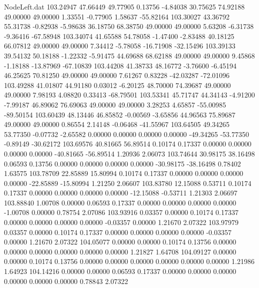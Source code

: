 \begin{filecontents}{NodeLeft.dat}
 103.24947   47.66449   49.77905     0.13756   -4.84038   30.75625   74.92188   49.00000   49.00000    1.33551   -0.77905    1.58637  -55.82164
 103.30027   43.36792   55.31738    -0.82938   -5.98638   36.18750   68.38750   49.00000   49.00000    5.63208   -6.31738   -9.36416  -67.58948
 103.34074   41.65588   54.78058    -1.47400   -2.83488   40.18125   66.07812   49.00000   49.00000    7.34412   -5.78058  -16.71908  -32.15496
 103.39133   39.54132   50.18188    -1.22332   -5.91475   44.69688   68.62188   49.00000   49.00000    9.45868   -1.18188  -13.87969  -67.10839
 103.44208   41.38733   48.16772    -3.76600   -6.45194   46.25625   70.81250   49.00000   49.00000    7.61267    0.83228  -42.03287  -72.01096
 103.49288   41.01807   44.91180     0.03012   -6.20125   48.70000   74.39687   49.00000   49.00000    7.98193    4.08820    0.33413  -68.79501
 103.53341   45.71747   44.34143    -4.91200   -7.99187   46.89062   76.69063   49.00000   49.00000    3.28253    4.65857  -55.00985  -89.50154
 103.60439   48.13446   46.85852    -0.00569   -3.65856   44.96563   75.89687   49.00000   49.00000    0.86554    2.14148   -0.06468  -41.55967
 103.64505   49.34265   53.77350    -0.07732   -2.65582    0.00000    0.00000    0.00000    0.00000  -49.34265  -53.77350   -0.89149  -30.62172
 103.69576   40.81665   56.89514     0.10174    0.17337    0.00000    0.00000    0.00000    0.00000  -40.81665  -56.89514    1.20936    2.06073
 103.74644   30.98175   38.16498     0.06593    0.13756    0.00000    0.00000    0.00000    0.00000  -30.98175  -38.16498    0.78402    1.63575
 103.78709   22.85889   15.80994     0.10174    0.17337    0.00000    0.00000    0.00000    0.00000  -22.85889  -15.80994    1.21250    2.06607
 103.83780   12.15088    0.53711     0.10174    0.17337    0.00000    0.00000    0.00000    0.00000  -12.15088   -0.53711    1.21303    2.06697
 103.88840    1.00708    0.00000     0.06593    0.17337    0.00000    0.00000    0.00000    0.00000   -1.00708    0.00000    0.78754    2.07086
 103.93916    0.03357    0.00000     0.10174    0.17337    0.00000    0.00000    0.00000    0.00000   -0.03357    0.00000    1.21670    2.07322
 103.97979    0.03357    0.00000     0.10174    0.17337    0.00000    0.00000    0.00000    0.00000   -0.03357    0.00000    1.21670    2.07322
 104.05077    0.00000    0.00000     0.10174    0.13756    0.00000    0.00000    0.00000    0.00000    0.00000    0.00000    1.21827    1.64708
 104.09127    0.00000    0.00000     0.10174    0.13756    0.00000    0.00000    0.00000    0.00000    0.00000    0.00000    1.21986    1.64923
 104.14216    0.00000    0.00000     0.06593    0.17337    0.00000    0.00000    0.00000    0.00000    0.00000    0.00000    0.78843    2.07322

\end{filecontents}
